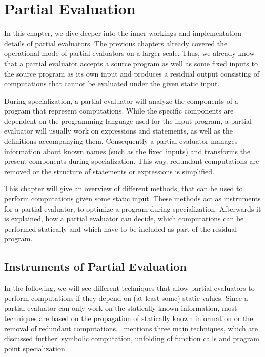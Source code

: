 
\section{Partial Evaluation}\label{sec:partial-evaluation}

In this chapter, we dive deeper into the inner workings and implementation details of partial evaluators.
The previous chapters already covered the operational mode of partial evaluators on a larger scale.
Thus, we already know that a partial evaluator accepts a source program as well as some fixed inputs to the source program as its own input and produces a residual output consisting of computations that cannot be evaluated under the given static input.

During specialization, a partial evaluator will analyze the components of a program that represent computations.
While the specific components are dependent on the programming language used for the input program, a partial evaluator will usually work on expressions and statements, as well as the definitions accompanying them.
Consequently a partial evaluator manages information about known names (such as the fixed inputs) and transforms the present components during specialization.
This way, redundant computations are removed or the structure of statements or expressions is simplified.

This chapter will give an overview of different methods, that can be used to perform computations given some static input.
These methods act as instruments for a partial evaluator, to optimize a program during specialization.
Afterwards it is explained, how a partial evaluator can decide, which computations can be performed statically and which have to be included as part of the residual program.


\subsection{Instruments of Partial Evaluation}\label{sec:pe-instruments}

In the following, we will see different techniques that allow partial evaluators to perform computations if they depend on (at least some) static values.
Since a partial evaluator can only work on the statically known information, most techniques are based on the propagation of statically known information or the removal of redundant computations.
\cite[Chap. 1]{Jones_PartialEvaluation}~mentions three main techniques, which are discussed further: symbolic computation, unfolding of function calls and program point specialization.

